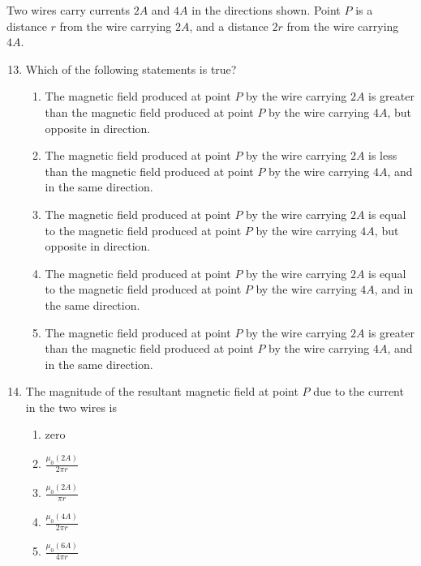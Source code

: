 \documentclass[11pt]{article}
\begin{document}
\begin{multicols}{2}
  Two wires carry currents $2A$ and $4A$ in the directions shown. Point $P$ is
  a distance $r$ from the wire carrying $2A$, and a distance $2r$ from the wire
  carrying $4A$.
  \begin{center}
  \end{center}

  \begin{enumerate}[leftmargin=18pt]
    \setcounter{enumi}{12}
  \item Which of the following statements is true?
    \begin{enumerate}[noitemsep,topsep=0pt,leftmargin=18pt,label=(\Alph*)]
    \item The magnetic field produced at point $P$ by the wire carrying $2A$ is
      greater than the magnetic field produced at point $P$ by the wire
      carrying $4A$, but opposite in direction.
    \item The magnetic field produced at point $P$ by the wire carrying $2A$ is
      less than the magnetic field produced at point $P$ by the wire carrying 
      $4A$, and in the same direction.
    \item The magnetic field produced at point $P$ by the wire carrying $2A$ is
      equal to the magnetic field produced at point $P$ by the wire carrying
      $4A$, but opposite in direction.
    \item The magnetic field produced at point $P$ by the wire carrying $2A$ is
      equal to the magnetic field produced at point $P$ by the wire carrying
      $4A$, and in the same direction.
    \item The magnetic field produced at point $P$ by the wire carrying $2A$ is
      greater than the magnetic field produced at point $P$ by the wire
      carrying $4A$, and in the same direction.
    \end{enumerate}

  \item The magnitude of the resultant magnetic field at point $P$ due to the
    current in the two wires is
    \begin{enumerate}[noitemsep,topsep=0pt,leftmargin=18pt,label=(\Alph*)]
    \item zero
    \item $\displaystyle\frac{\mu_0(2A)}{2\pi r}$
    \item $\displaystyle\frac{\mu_0(2A)}{\pi r}$
    \item $\displaystyle\frac{\mu_0(4A)}{2\pi r}$
    \item $\displaystyle\frac{\mu_0(6A)}{4\pi r}$
    \end{enumerate}


\end{enumerate}
\end{multicols}
\end{document}
